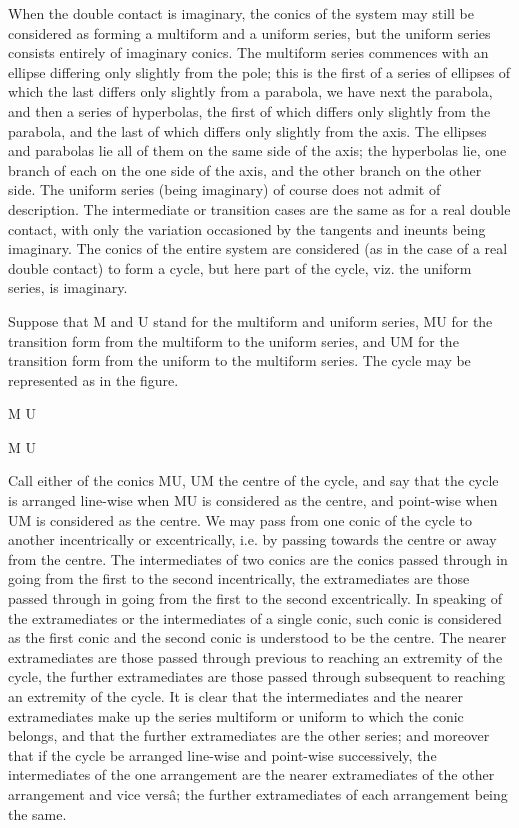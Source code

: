 \documentclass[11pt,a4paper]{book}
\begin{document}
When the double contact is imaginary, the conics of the system may still be considered as forming a multiform and a uniform series, but the uniform series consists entirely of imaginary conics. The multiform series commences with an ellipse differing only slightly from the pole; this is the first of a series of ellipses of which the last differs only slightly from a parabola, we have next the parabola, and then a series of hyperbolas, the first of which differs only slightly from the parabola, and the last of which differs only slightly from the axis. The ellipses and parabolas lie all of them on the same side of the axis; the hyperbolas lie, one branch of each on the one side of the axis, and the other branch on the other side. The uniform series (being imaginary) of course does not admit of description. The intermediate or transition cases are the same as for a real double contact, with only the variation occasioned by the tangents and ineunts being imaginary. The conics of the entire system are considered (as in the case of a real double contact) to form a cycle, but here part of the cycle, viz. the uniform series, is imaginary.

Suppose that M and U stand for the multiform and uniform series, MU for the transition form from the multiform to the uniform series, and UM for the transition form from the uniform to the multiform series. The cycle may be represented as in the figure.

\hfill M U

\hfill M \hspace{2cm} U

Call either of the conics MU, UM the centre of the cycle, and say that the cycle is arranged line-wise when MU is considered as the centre, and point-wise when UM is considered as the centre. We may pass from one conic of the cycle to another incentrically or excentrically, i.e. by passing towards the centre or away from the centre. The intermediates of two conics are the conics passed through in going from the first to the second incentrically, the extramediates are those passed through in going from the first to the second excentrically. In speaking of the extramediates or the intermediates of a single conic, such conic is considered as the first conic and the second conic is understood to be the centre. The nearer extramediates are those passed through previous to reaching an extremity of the cycle, the further extramediates are those passed through subsequent to reaching an extremity of the cycle. It is clear that the intermediates and the nearer extramediates make up the series multiform or uniform to which the conic belongs, and that the further extramediates are the other series; and moreover that if the cycle be arranged line-wise and point-wise successively, the intermediates of the one arrangement are the nearer extramediates of the other arrangement and vice vers\^{a}; the further extramediates of each arrangement being the same.
\end{document}
